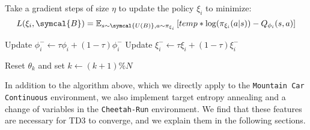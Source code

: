 \documentclass[base]{subfiles}
\begin{document}
\begin{algorithm}
\begin{algorithmic}[1]

		\State Take a gradient steps of size $\eta$ to update the policy $\xi_i$ to minimize:
		\begin{equation}
			\notag
			L(\xi_i, \symcal{B}) = \mathbb{E}_{s \sim \symcal{U(B)}, a \sim \pi_{\xi_i}} \left[  temp * \log (\pi_{\xi_i} (a | s)) - Q_{\phi_i} (s,a) \right]
		\end{equation}

		\State Update $\phi_i^{-} \leftarrow \tau \phi_i + (1-\tau) \phi_i^{-}$
		\State Update $\xi_i^{-} \leftarrow \tau \xi_i + (1-\tau) \xi_i^{-}$


		\EndIf

		\EndFor
		\EndFor

		\State Reset $\theta_k$ and set $k \leftarrow (k+1) \% N$
		\EndIf

		\EndFor
		\EndFor
	\end{algorithmic}
\end{algorithm}

In addition to the algorithm above, which we directly apply to the \texttt{Mountain Car Continuous} environment, we also implement target entropy annealing and a change of variables in the \texttt{Cheetah-Run} environment. We find that these features are necessary for TD3 to converge, and we explain them in the following sections.
\end{document}
